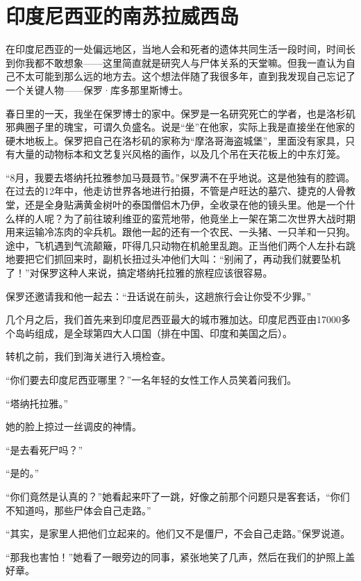 \documentclass[12pt,oneside]{book}
\begin{document}
\section{印度尼西亚的南苏拉威西岛}
\begin{bookref}[frametitle={\cite{好好告别：世界葬礼观察手记}}]

在印度尼西亚的一处偏远地区，当地人会和死者的遗体共同生活一段时间，时间长到你我都不敢想象——这里简直就是研究人与尸体关系的天堂嘛。但我一直认为自己不太可能到那么远的地方去。这个想法伴随了我很多年，直到我发现自己忘记了一个关键人物——保罗·库多那里斯博士。

春日里的一天，我坐在保罗博士的家中。保罗是一名研究死亡的学者，也是洛杉矶邪典圈子里的瑰宝，可谓久负盛名。说是“坐”在他家，实际上我是直接坐在他家的硬木地板上。保罗把自己在洛杉矶的家称为“摩洛哥海盗城堡”，里面没有家具，只有大量的动物标本和文艺复兴风格的画作，以及几个吊在天花板上的中东灯笼。

“8月，我要去塔纳托拉雅参加马聂聂节。”保罗满不在乎地说。这是他独有的腔调。在过去的12年中，他走访世界各地进行拍摄，不管是卢旺达的墓穴、捷克的人骨教堂，还是全身贴满黄金树叶的泰国僧侣木乃伊，全收录在他的镜头里。他是一个什么样的人呢？为了前往玻利维亚的蛮荒地带，他竟坐上一架在第二次世界大战时期用来运输冷冻肉的伞兵机。跟他一起的还有一个农民、一头猪、一只羊和一只狗。途中，飞机遇到气流颠簸，吓得几只动物在机舱里乱跑。正当他们两个人左扑右跳地要把它们抓回来时，副机长扭过头冲他们大叫：“别闹了，再动我们就要坠机了！”对保罗这种人来说，搞定塔纳托拉雅的旅程应该很容易。

保罗还邀请我和他一起去：“丑话说在前头，这趟旅行会让你受不少罪。”

几个月之后，我们首先来到印度尼西亚最大的城市雅加达。印度尼西亚由17000多个岛屿组成，是全球第四大人口国（排在中国、印度和美国之后）。

转机之前，我们到海关进行入境检查。

“你们要去印度尼西亚哪里？”一名年轻的女性工作人员笑着问我们。

“塔纳托拉雅。”

她的脸上掠过一丝调皮的神情。

“是去看死尸吗？”

“是的。”

“你们竟然是认真的？”她看起来吓了一跳，好像之前那个问题只是客套话，“你们不知道吗，那些尸体会自己走路。”

“其实，是家里人把他们立起来的。他们又不是僵尸，不会自己走路。”保罗说道。

“那我也害怕！”她看了一眼旁边的同事，紧张地笑了几声，然后在我们的护照上盖好章。


\end{bookref}
\end{document}
